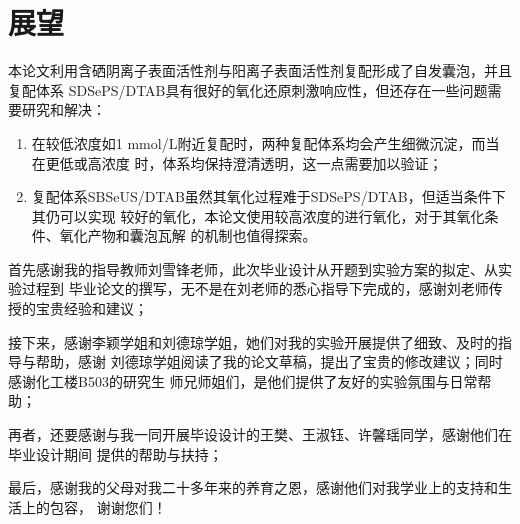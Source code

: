 \documentclass[bachelor,winfonts,replaceperiod]{jnuthesis}
\begin{document}
    \section{展望}
    本论文利用含硒阴离子表面活性剂与阳离子表面活性剂复配形成了自发囊泡，并且复配体系
    SDSePS/DTAB具有很好的氧化还原刺激响应性，但还存在一些问题需要研究和解决：
    \begin{enumerate}
        \item 在较低浓度如1 mmol/L附近复配时，两种复配体系均会产生细微沉淀，而当在更低或高浓度
        时，体系均保持澄清透明，这一点需要加以验证；
        \item 复配体系SBSeUS/DTAB虽然其氧化过程难于SDSePS/DTAB，但适当条件下其仍可以实现
        较好的氧化，本论文使用较高浓度的进行氧化，对于其氧化条件、氧化产物和囊泡瓦解
        的机制也值得探索。
    \end{enumerate}
    
    \begin{backmatter}
    
    \end{backmatter}

    \begin{acknowledgement}
        首先感谢我的指导教师刘雪锋老师，此次毕业设计从开题到实验方案的拟定、从实验过程到
        毕业论文的撰写，无不是在刘老师的悉心指导下完成的，感谢刘老师传授的宝贵经验和建议；
        
        接下来，感谢李颖学姐和刘德琼学姐，她们对我的实验开展提供了细致、及时的指导与帮助，感谢
        刘德琼学姐阅读了我的论文草稿，提出了宝贵的修改建议；同时感谢化工楼B503的研究生
        师兄师姐们，是他们提供了友好的实验氛围与日常帮助；
        
        再者，还要感谢与我一同开展毕设设计的王樊、王淑钰、许馨瑶同学，感谢他们在毕业设计期间
        提供的帮助与扶持；
        
        最后，感谢我的父母对我二十多年来的养育之恩，感谢他们对我学业上的支持和生活上的包容，
        谢谢您们！
    \end{acknowledgement}
    
\end{document}
